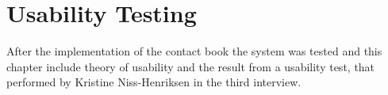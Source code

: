 \chapter{Usability Testing}
After the implementation of the contact book the system was tested and this chapter include theory of usability and the result from a usability test, that performed by Kristine Niss-Henriksen in the third interview.
  